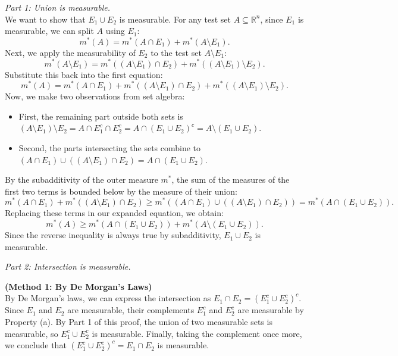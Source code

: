 \begin{pfbox}
    \textit{Part 1: Union is measurable.} \\
    We want to show that $E_1 \cup E_2$ is measurable. For any test set $A \subseteq \mathbb{R}^n$, since $E_1$ is measurable, we can split $A$ using $E_1$:
    $$m^*(A) = m^*(A \cap E_1) + m^*(A \setminus E_1).$$
    Next, we apply the measurability of $E_2$ to the test set $A \setminus E_1$:
    $$m^*(A \setminus E_1) = m^*((A \setminus E_1) \cap E_2) + m^*((A \setminus E_1) \setminus E_2).$$
    Substitute this back into the first equation:
    $$m^*(A) = m^*(A \cap E_1) + m^*((A \setminus E_1) \cap E_2) + m^*((A \setminus E_1) \setminus E_2).$$
    Now, we make two observations from set algebra:
    \begin{itemize}
        \item First, the remaining part outside both sets is $(A \setminus E_1) \setminus E_2 = A \cap E_1^c \cap E_2^c = A \cap (E_1 \cup E_2)^c = A \setminus (E_1 \cup E_2)$.
        \item Second, the parts intersecting the sets combine to $(A \cap E_1) \cup ((A \setminus E_1) \cap E_2) = A \cap (E_1 \cup E_2)$.
    \end{itemize}
    By the subadditivity of the outer measure $m^*$, the sum of the measures of the first two terms is bounded below by the measure of their union:
    $$m^*(A \cap E_1) + m^*((A \setminus E_1) \cap E_2) \ge m^*((A \cap E_1) \cup ((A \setminus E_1) \cap E_2)) = m^*(A \cap (E_1 \cup E_2)).$$
    Replacing these terms in our expanded equation, we obtain:
    $$m^*(A) \ge m^*(A \cap (E_1 \cup E_2)) + m^*(A \setminus (E_1 \cup E_2)).$$
    Since the reverse inequality is always true by subadditivity, $E_1 \cup E_2$ is measurable.

    \textit{Part 2: Intersection is measurable.}

    \textbf{(Method 1: By De Morgan's Laws)} \\
    By De Morgan's laws, we can express the intersection as $E_1 \cap E_2 = (E_1^c \cup E_2^c)^c$.
    Since $E_1$ and $E_2$ are measurable, their complements $E_1^c$ and $E_2^c$ are measurable by Property (a).
    By Part 1 of this proof, the union of two measurable sets is measurable, so $E_1^c \cup E_2^c$ is measurable.
    Finally, taking the complement once more, we conclude that $(E_1^c \cup E_2^c)^c = E_1 \cap E_2$ is measurable.


\end{pfbox}
